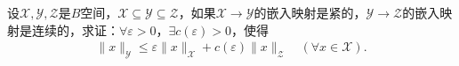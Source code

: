 \documentclass[../../main.tex]{subfiles}%
\begin{document}
\begin{example}
设$\mathscr{X},\mathscr{Y},\mathscr{Z}$是$B$空间，$\mathscr{X}\subseteq\mathscr{Y}\subseteq\mathscr{Z}$，如果$\mathscr{X}\to\mathscr{Y}$的嵌入映射是紧的，$\mathscr{Y}\to\mathscr{Z}$的嵌入映射是连续的，求证：$\forall\varepsilon>0$，$\exists c(\varepsilon)>0$，使得
\begin{align*}
\|x\|_{\mathscr{Y}}\leqslant\varepsilon\|x\|_{\mathscr{X}}+c(\varepsilon)\|x\|_{\mathscr{Z}}\quad (\forall x\in\mathscr{X}).
\end{align*}
\end{example}
\end{document}

